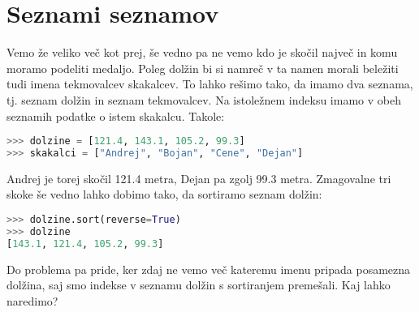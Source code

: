 \section{Seznami seznamov}

Vemo že veliko več kot prej, še vedno pa ne vemo kdo je skočil največ in komu moramo podeliti medaljo. Poleg dolžin bi si namreč v ta namen morali beležiti tudi imena tekmovalcev skakalcev. To lahko rešimo tako, da imamo dva seznama, tj. seznam dolžin in seznam tekmovalcev. Na istoležnem indeksu imamo v obeh seznamih podatke o istem skakalcu. Takole:
\begin{lstlisting}[language=Python]
>>> dolzine = [121.4, 143.1, 105.2, 99.3]
>>> skakalci = ["Andrej", "Bojan", "Cene", "Dejan"]
\end{lstlisting}
Andrej je torej skočil 121.4 metra, Dejan pa zgolj 99.3 metra. Zmagovalne tri skoke še vedno lahko dobimo tako, da sortiramo seznam dolžin:
\begin{lstlisting}[language=Python]
>>> dolzine.sort(reverse=True)
>>> dolzine
[143.1, 121.4, 105.2, 99.3]
\end{lstlisting}
Do problema pa pride, ker zdaj ne vemo več kateremu imenu pripada posamezna dolžina, saj smo indekse v seznamu dolžin s sortiranjem premešali. Kaj lahko naredimo? 

